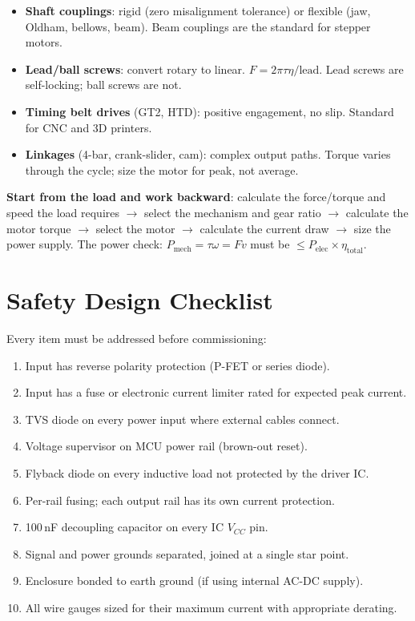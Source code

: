 \documentclass[11pt,letterpaper,twoside,openany]{book}
\begin{document}
\begin{itemize}[leftmargin=1.5em]
  \item \textbf{Shaft couplings}: rigid (zero misalignment tolerance) or flexible (jaw, Oldham, bellows, beam). Beam couplings are the standard for stepper motors.
  \item \textbf{Lead/ball screws}: convert rotary to linear. $F = 2\pi \tau \eta / \text{lead}$. Lead screws are self-locking; ball screws are not.
  \item \textbf{Timing belt drives} (GT2, HTD): positive engagement, no slip. Standard for CNC and 3D printers.
  \item \textbf{Linkages} (4-bar, crank-slider, cam): complex output paths. Torque varies through the cycle; size the motor for peak, not average.
\end{itemize}

\begin{keyconceptbox}
\textbf{Start from the load and work backward}: calculate the force/torque and speed the load requires $\to$ select the mechanism and gear ratio $\to$ calculate the motor torque $\to$ select the motor $\to$ calculate the current draw $\to$ size the power supply. The power check: $P_{\text{mech}} = \tau \omega = F v$ must be $\leq P_{\text{elec}} \times \eta_{\text{total}}$.
\end{keyconceptbox}


\section{Safety Design Checklist}
\label{sec:checklist}

Every item must be addressed before commissioning:

\begin{enumerate}[leftmargin=1.5em]
  \item Input has reverse polarity protection (P-FET or series diode).
  \item Input has a fuse or electronic current limiter rated for expected peak current.
  \item TVS diode on every power input where external cables connect.
  \item Voltage supervisor on MCU power rail (brown-out reset).
  \item Flyback diode on every inductive load not protected by the driver IC.
  \item Per-rail fusing; each output rail has its own current protection.
  \item 100\,nF decoupling capacitor on every IC $V_{CC}$ pin.
  \item Signal and power grounds separated, joined at a single star point.
  \item Enclosure bonded to earth ground (if using internal AC-DC supply).
  \item All wire gauges sized for their maximum current with appropriate derating.
\end{enumerate}
\end{document}

